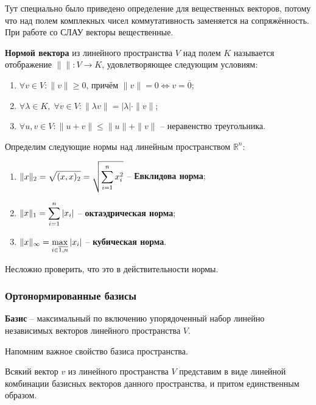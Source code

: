 \documentclass{article}
\begin{document}
Тут специально было приведено определение для вещественных векторов, потому что
над полем комплекных чисел коммутативность заменяется на сопряжённость. При
работе со СЛАУ векторы вещественные.

\begin{define}
	\textbf{Нормой вектора} из линейного пространства $V$ над полем $K$
	называется отображение $\|\|: V\rightarrow K$, удовлетворяющее
	следующим условиям:
	\begin{enumerate}[nosep]
		\item $\forall v\in V: \|v\|\ge 0$, причём $\|v\|=0
			\Leftrightarrow v=\overline{0}$;
		\item $\forall \lambda\in K,\;\forall v\in V:
			\|\lambda v\|=|\lambda|\cdot\|v\|$;
		\item $\forall u,v\in V: \|u+v\|\le\|u\|+\|v\|$ -- неравенство
			треугольника.
	\end{enumerate}
\end{define}

\begin{define}
	Определим следующие нормы над линейным пространством $\mathbb R^n$:
	\begin{enumerate}[nosep]
		\item $\mathlarger{\|x\|_2=\sqrt{(x,x)_2}=\sqrt{\sum_{i=1}^{n}
			x_i^2}}$ -- \textbf{Евклидова норма};
		\item $\mathlarger{\|x\|_1=\sum_{i=1}^{n}|x_i|}$ --
			\textbf{октаэдрическая норма}; \\
		\item $\mathlarger{\|x\|_\infty=\max_{i\in\overline{1,n}}
			|x_i|}$ -- \textbf{кубическая норма}.
	\end{enumerate}
\end{define}

Несложно проверить, что это в действительности нормы.

\subsubsection{Ортонормированные базисы}
\begin{define}
	\textbf{Базис} -- максимальный по включению упорядоченный набор линейно
	независимых векторов линейного пространства $V$.
\end{define}

Напомним важное свойство базиса пространства.
\begin{theorem}
	Всякий вектор $v$ из линейного пространства $V$ представим в виде
	линейной комбинации базисных векторов данного пространства, и притом
	единственным образом.
\end{theorem}
\end{document}
